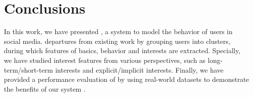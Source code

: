 \section{Conclusions}
\label{sec:conclu}

\par In this work, we have presented \sys{}, a system to model the \retg{} behavior of users in social media.
\sys{} departures from existing work by grouping users into clusters, during which features of basics, behavior and interests are extracted.
Specially, we have studied interest features from various perspectives, such as long-term/short-term interests and explicit/implicit interests.
Finally, we have provided a performance evaluation of \sys{} by using real-world datasets to demonstrate the benefits of our system \sys{}.

